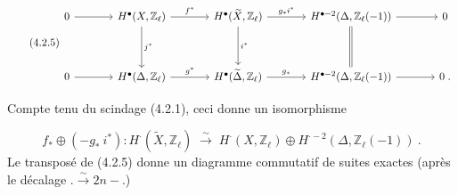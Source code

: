 \begin{equation}\tag{4.2.5}
\begin{tikzcd}[column sep=large, row sep=huge]
0 \arrow[r] & H^{\bullet}(X,\mathbb{Z}_{\ell}) \arrow[r, "f^{*}"] \arrow[d, "j^{*}"] & H^{\bullet}(\widetilde{X},\mathbb{Z}_{\ell}) \arrow[r, "g_{*}i^{*}"] \arrow[d, "i^{*}"] & H^{\bullet-2}(\Delta,\mathbb{Z}_{\ell}(-1)) \arrow[r] \arrow[d, Rightarrow, no head] & 0 \\
0 \arrow[r] & H^{\bullet}(\Delta,\mathbb{Z}_{\ell}) \arrow[r, "g^{*}"] & H^{\bullet}(\widetilde{\Delta},\mathbb{Z}_{\ell}) \arrow[r, "g_{*}"] & H^{\bullet-2}(\Delta,\mathbb{Z}_{\ell}(-1)) \arrow[r] & 0\;.
\end{tikzcd}
\end{equation}


Compte tenu du scindage (4.2.1), ceci donne un isomorphisme

\begin{equation}\tag{4.2.6}
f_* \oplus (-g_* \ i^*) : H^{\cdot}(\widetilde{X},\mathbb{Z}_\ell) \;\stackrel{\sim}{\longrightarrow}\; H^{\cdot}(X,\mathbb{Z}_\ell) \oplus H^{\cdot-2}(\Delta,\mathbb{Z}_\ell(-1)) \ .
\end{equation}
Le transposé de (4.2.5) donne un diagramme commutatif de suites exactes (après le décalage $. \stackrel{\sim}{\longrightarrow} 2n-.$)

